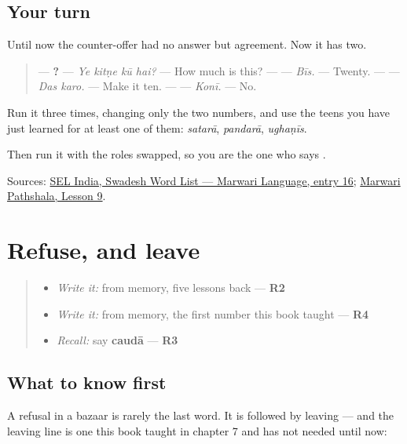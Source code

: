 \subsection*{Your turn}
Until now the counter-offer had no answer but agreement. Now it has two.

\begin{quote}
— \textbf{   ?} — \emph{Ye kitṇe kū hai?} — How much is this? — \textbf{} — \emph{Bīs.} — Twenty. — \textbf{ } — \emph{Das karo.} — Make it ten. — \textbf{} — \emph{Konī.} — No.
\end{quote}

Run it three times, changing only the two numbers, and use the teens you have just learned for at least one of them: \emph{satarā}, \emph{pandarā}, \emph{ughaṇīs}.

Then run it with the roles swapped, so you are the one who says \textbf{}.

\begin{tcolorbox}[breakable,colback=teal!4,colframe=teal!35!black,title={Before you move on}]
Sources: \href{https://selindia.org/wp-content/uploads/2025/05/SWL-Marwari\_IPA.pdf}{SEL India, Swadesh Word List — Marwari Language, entry 16}; \href{https://www.marwaripathshala.com/marwari-lesson-9-english}{Marwari Pathshala, Lesson 9}.
\end{tcolorbox}
\section[Practice]{Refuse, and leave}

\label{lesson:MW-C39-refusal-four}



\begin{quote}
\begin{itemize}
\raggedright
  \item \emph{Write it:} \textbf{} from memory, five lessons back — \textbf{R2}
  \item \emph{Write it:} \textbf{} from memory, the first number this book taught — \textbf{R4}
  \item \emph{Recall:} say \textbf{caudā} — \textbf{R3}
\end{itemize}
\end{quote}

\subsection*{What to know first}
A refusal in a bazaar is rarely the last word. It is followed by leaving — and the leaving line is one this book taught in chapter 7 and has not needed until now:

